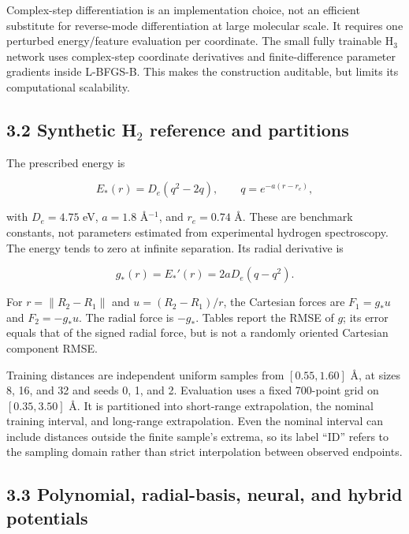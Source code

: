 \documentclass[
  11pt,
  a4paper,
]{article}
\begin{document}
Complex-step differentiation is an implementation choice, not an
efficient substitute for reverse-mode differentiation at large molecular
scale. It requires one perturbed energy/feature evaluation per
coordinate. The small fully trainable H\(_3\) network uses complex-step
coordinate derivatives and finite-difference parameter gradients inside
L-BFGS-B. This makes the construction auditable, but limits its
computational scalability.

\hypertarget{synthetic-h_2-reference-and-partitions}{%
\subsection{\texorpdfstring{3.2 Synthetic H\(_2\) reference and
partitions}{3.2 Synthetic H\_2 reference and partitions}}\label{synthetic-h_2-reference-and-partitions}}

The prescribed energy is

\[E_*(r)=D_e(q^2-2q),\qquad q=e^{-a(r-r_e)},\]

with \(D_e=4.75\) eV, \(a=1.8\) Å\(^{-1}\), and \(r_e=0.74\) Å. These
are benchmark constants, not parameters estimated from experimental
hydrogen spectroscopy. The energy tends to zero at infinite separation.
Its radial derivative is

\[g_*(r)=E_*'(r)=2aD_e(q-q^2).\]

For \(r=\|R_2-R_1\|\) and \(u=(R_2-R_1)/r\), the Cartesian forces are
\(F_1=g_*u\) and \(F_2=-g_*u\). The radial force is \(-g_*\). Tables
report the RMSE of \(g\); its error equals that of the signed radial
force, but is not a randomly oriented Cartesian component RMSE.

Training distances are independent uniform samples from \([0.55,1.60]\)
Å, at sizes 8, 16, and 32 and seeds 0, 1, and 2. Evaluation uses a fixed
700-point grid on \([0.35,3.50]\) Å. It is partitioned into short-range
extrapolation, the nominal training interval, and long-range
extrapolation. Even the nominal interval can include distances outside
the finite sample's extrema, so its label ``ID'' refers to the sampling
domain rather than strict interpolation between observed endpoints.

\hypertarget{polynomial-radial-basis-neural-and-hybrid-potentials}{%
\subsection{3.3 Polynomial, radial-basis, neural, and hybrid
potentials}\label{polynomial-radial-basis-neural-and-hybrid-potentials}}
\end{document}
